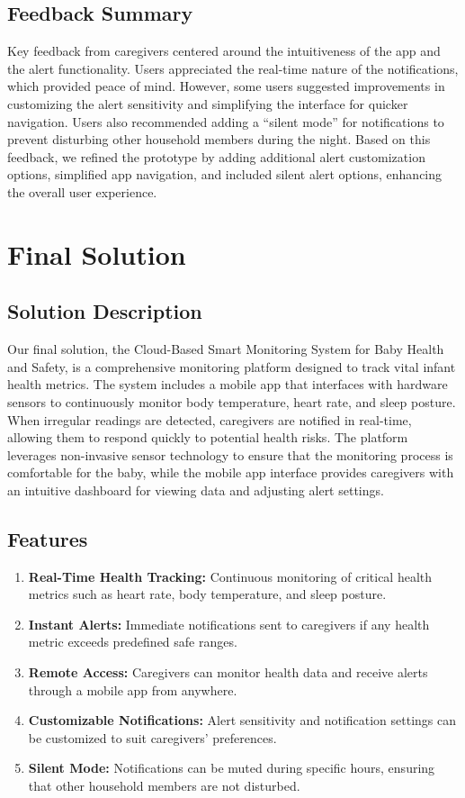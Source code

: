 \documentclass[12pt,a4paper]{report}
\begin{document}
\section{Feedback Summary}
Key feedback from caregivers centered around the intuitiveness of the app and the alert functionality. Users appreciated the real-time nature of the notifications, which provided peace of mind. However, some users suggested improvements in customizing the alert sensitivity and simplifying the interface for quicker navigation. Users also recommended adding a “silent mode” for notifications to prevent disturbing other household members during the night. Based on this feedback, we refined the prototype by adding additional alert customization options, simplified app navigation, and included silent alert options, enhancing the overall user experience.

\chapter{Final Solution}
\section{Solution Description}
Our final solution, the Cloud-Based Smart Monitoring System for Baby Health and Safety, is a comprehensive monitoring platform designed to track vital infant health metrics. The system includes a mobile app that interfaces with hardware sensors to continuously monitor body temperature, heart rate, and sleep posture. When irregular readings are detected, caregivers are notified in real-time, allowing them to respond quickly to potential health risks. The platform leverages non-invasive sensor technology to ensure that the monitoring process is comfortable for the baby, while the mobile app interface provides caregivers with an intuitive dashboard for viewing data and adjusting alert settings.

\section{Features}
\begin{enumerate}
  \item \textbf{Real-Time Health Tracking:} Continuous monitoring of critical health metrics such as heart rate, body temperature, and sleep posture.
  \item \textbf{Instant Alerts:} Immediate notifications sent to caregivers if any health metric exceeds predefined safe ranges.
  \item \textbf{Remote Access:} Caregivers can monitor health data and receive alerts through a mobile app from anywhere.
  \item \textbf{Customizable Notifications:} Alert sensitivity and notification settings can be customized to suit caregivers' preferences.
  \item \textbf{Silent Mode:} Notifications can be muted during specific hours, ensuring that other household members are not disturbed.
\end{enumerate}
\end{document}
